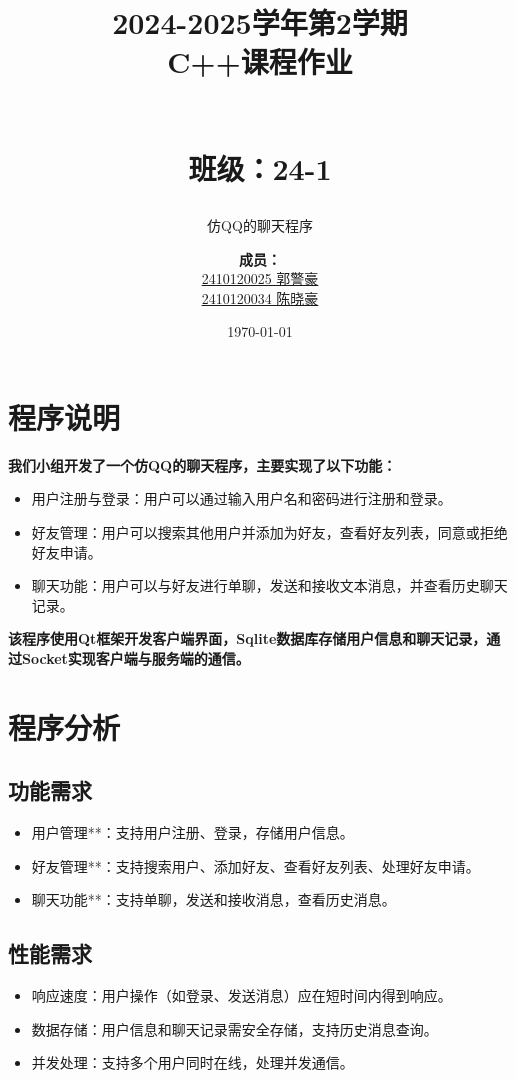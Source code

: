 \documentclass[UTF8]{ctexart}
\title{\textbf{2024-2025学年第2学期}\\ \textbf{C++课程作业}\\ \subtitle{仿QQ的聊天程序} \\ \small 班级：24-1} %
\author{\textbf{成员：}\\ \underline{2410120025 郭警豪} \\ \underline{2410120034 陈晓豪}
}
\date{\today}
\begin{document}
\maketitle
\tableofcontents
\newpage
\section{程序说明}


\textbf{我们小组开发了一个仿QQ的聊天程序，主要实现了以下功能：}


\begin{itemize}
	\item 用户注册与登录：用户可以通过输入用户名和密码进行注册和登录。
	\item 好友管理：用户可以搜索其他用户并添加为好友，查看好友列表，同意或拒绝好友申请。
	\item 聊天功能：用户可以与好友进行单聊，发送和接收文本消息，并查看历史聊天记录。
\end{itemize}

\textbf{该程序使用Qt框架开发客户端界面，Sqlite数据库存储用户信息和聊天记录，通过Socket实现客户端与服务端的通信。}

\section{程序分析}
\subsection{功能需求}
\begin{itemize}
	\item 用户管理**：支持用户注册、登录，存储用户信息。
	\item 好友管理**：支持搜索用户、添加好友、查看好友列表、处理好友申请。
	\item 聊天功能**：支持单聊，发送和接收消息，查看历史消息。
\end{itemize}	
\subsection{性能需求}
\begin{itemize}
	\item 响应速度：用户操作（如登录、发送消息）应在短时间内得到响应。
	\item 数据存储：用户信息和聊天记录需安全存储，支持历史消息查询。
	\item 并发处理：支持多个用户同时在线，处理并发通信。
\end{itemize}
	
\end{document}

